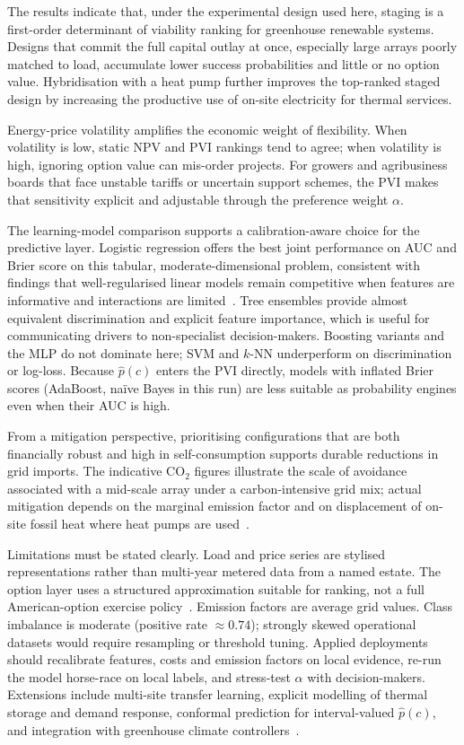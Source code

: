 \documentclass[agriengineering,article,submit,pdftex,moreauthors]{Definitions/mdpi}
\begin{document}
The results indicate that, under the experimental design used here, staging is a first-order determinant of viability ranking for greenhouse renewable systems. Designs that commit the full capital outlay at once, especially large arrays poorly matched to load, accumulate lower success probabilities and little or no option value. Hybridisation with a heat pump further improves the top-ranked staged design by increasing the productive use of on-site electricity for thermal services.

Energy-price volatility amplifies the economic weight of flexibility. When volatility is low, static NPV and PVI rankings tend to agree; when volatility is high, ignoring option value can mis-order projects. For growers and agribusiness boards that face unstable tariffs or uncertain support schemes, the PVI makes that sensitivity explicit and adjustable through the preference weight $\alpha$.

The learning-model comparison supports a calibration-aware choice for the predictive layer. Logistic regression offers the best joint performance on AUC and Brier score on this tabular, moderate-dimensional problem, consistent with findings that well-regularised linear models remain competitive when features are informative and interactions are limited~\cite{ref-ferri,ref-guo}. Tree ensembles provide almost equivalent discrimination and explicit feature importance, which is useful for communicating drivers to non-specialist decision-makers. Boosting variants and the MLP do not dominate here; SVM and $k$-NN underperform on discrimination or log-loss. Because $\hat{p}(c)$ enters the PVI directly, models with inflated Brier scores (AdaBoost, na\"ive Bayes in this run) are less suitable as probability engines even when their AUC is high.

From a mitigation perspective, prioritising configurations that are both financially robust and high in self-consumption supports durable reductions in grid imports. The indicative CO$_2$ figures illustrate the scale of avoidance associated with a mid-scale array under a carbon-intensive grid mix; actual mitigation depends on the marginal emission factor and on displacement of on-site fossil heat where heat pumps are used~\cite{ref-ipcc,ref-iea}.

Limitations must be stated clearly. Load and price series are stylised representations rather than multi-year metered data from a named estate. The option layer uses a structured approximation suitable for ranking, not a full American-option exercise policy~\cite{ref-trigeorgis,ref-hull}. Emission factors are average grid values. Class imbalance is moderate (positive rate $\approx 0.74$); strongly skewed operational datasets would require resampling or threshold tuning. Applied deployments should recalibrate features, costs and emission factors on local evidence, re-run the model horse-race on local labels, and stress-test $\alpha$ with decision-makers. Extensions include multi-site transfer learning, explicit modelling of thermal storage and demand response, conformal prediction for interval-valued $\hat{p}(c)$, and integration with greenhouse climate controllers~\cite{ref-vanbeveren,ref-ahmad}.
\end{document}
